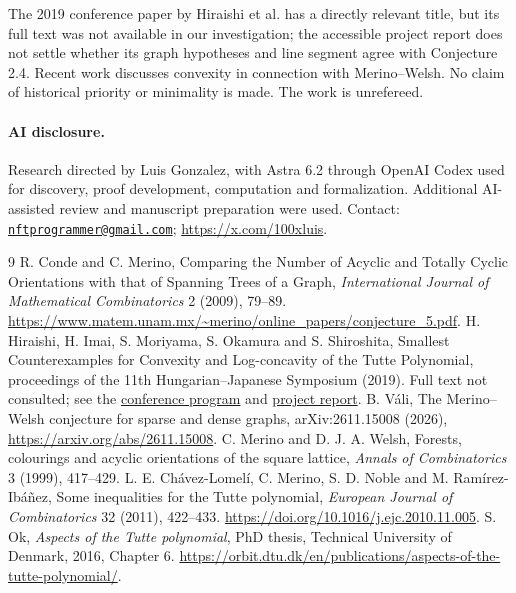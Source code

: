 \documentclass[11pt]{article}
\begin{document}
The 2019 conference paper by Hiraishi et al. \cite{H} has a directly relevant title, but its full text was not available in our investigation; the accessible project report does not settle whether its graph hypotheses and line segment agree with Conjecture 2.4. Recent work \cite{V} discusses convexity in connection with Merino--Welsh. No claim of historical priority or minimality is made. The work is unrefereed.

\paragraph{AI disclosure.} Research directed by Luis Gonzalez, with Astra 6.2 through OpenAI Codex used for discovery, proof development, computation and formalization. Additional AI-assisted review and manuscript preparation were used. Contact: \href{mailto:nftprogrammer@gmail.com}{\nolinkurl{nftprogrammer@gmail.com}}; \url{https://x.com/100xluis}.
\begin{thebibliography}{9}
 R. Conde and C. Merino, Comparing the Number of Acyclic and Totally Cyclic Orientations with that of Spanning Trees of a Graph, \emph{International Journal of Mathematical Combinatorics} 2 (2009), 79--89. \url{https://www.matem.unam.mx/~merino/online_papers/conjecture_5.pdf}.
 H. Hiraishi, H. Imai, S. Moriyama, S. Okamura and S. Shiroshita, Smallest Counterexamples for Convexity and Log-concavity of the Tutte Polynomial, proceedings of the 11th Hungarian--Japanese Symposium (2019). Full text not consulted; see the \href{https://www.opt.mist.i.u-tokyo.ac.jp/hj2019/wp-content/uploads/sites/3/2019/04/program19.pdf}{conference program} and \href{https://kaken.nii.ac.jp/ja/file/KAKENHI-PROJECT-16K12392/16K12392seika.pdf}{project report}.
 B. V\'ali, The Merino--Welsh conjecture for sparse and dense graphs, arXiv:2611.15008 (2026), \url{https://arxiv.org/abs/2611.15008}.
 C. Merino and D. J. A. Welsh, Forests, colourings and acyclic orientations of the square lattice, \emph{Annals of Combinatorics} 3 (1999), 417--429.
 L. E. Ch\'avez-Lomel\'i, C. Merino, S. D. Noble and M. Ram\'irez-Ib\'a\~nez, Some inequalities for the Tutte polynomial, \emph{European Journal of Combinatorics} 32 (2011), 422--433. \url{https://doi.org/10.1016/j.ejc.2010.11.005}.
 S. Ok, \emph{Aspects of the Tutte polynomial}, PhD thesis, Technical University of Denmark, 2016, Chapter 6. \url{https://orbit.dtu.dk/en/publications/aspects-of-the-tutte-polynomial/}.
\end{thebibliography}
\end{document}
